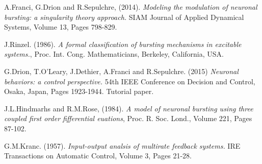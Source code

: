 \documentclass[a4paper, 12pt]{article}
\begin{document}
\begin{thebibliography}{9}
A.Franci, G.Drion and R.Sepulchre, (2014). \emph{Modeling the modulation of neuronal bursting: a singularity theory approach.} SIAM Journal of Applied Dynamical Systems, Volume 13, Pages 798-829. 

J.Rinzel. (1986). \emph{A formal classification of bursting mechanisms in excitable systems.}, Proc. Int. Cong. Mathematicians, Berkeley, California, USA. 

G.Drion, T.O'Leary, J.Dethier, A.Franci and R.Sepulchre. (2015) \emph{Neuronal behaviors: a control perspective.} 54th IEEE Conference on Decision and Control, Osaka, Japan, Pages 1923-1944. Tutorial paper.

J.L.Hindmarhs and R.M.Rose, (1984). \emph{A model of neuronal bursting using three coupled first order fifferential euations}, Proc. R. Soc. Lond., Volume 221, Pages 87-102. 

G.M.Kranc. (1957). \emph{Input-output analsis of multirate feedback systems.} IRE Transactions on Automatic Control, Volume 3, Pages 21-28. 

\end{thebibliography}
\end{document}
